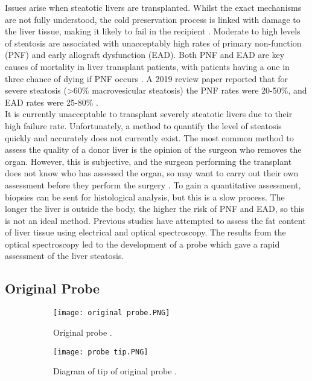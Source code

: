 Issues arise when steatotic livers are transplanted. Whilst the exact mechanisms are not fully understood, the cold preservation process is linked with damage to the liver tissue, making it likely to fail in the recipient \cite{Imber2002}. Moderate to high levels of steatosis are associated with unacceptably high rates of primary non-function (PNF) and early allograft dysfunction (EAD). Both PNF and EAD are key causes of mortality in liver transplant patients, with patients having a one in three chance of dying if PNF occurs \cite{Robertson}. A 2019 review paper reported that for severe steatosis (\textgreater60\% macrovesicular steatosis) the PNF rates were 20-50\%, and EAD rates were 25-80\% \cite{Linares2019}.\\

It is currently unacceptable to transplant severely steatotic livers due to their high failure rate. Unfortunately, a method to quantify the level of steatosis quickly and accurately does not currently exist. The most common method to assess the quality of a donor liver is the opinion of the surgeon who removes the organ. However, this is subjective, and the surgeon performing the transplant does not know who has assessed the organ, so may want to carry out their own assessment before they perform the surgery \cite{Robertson}. To gain a quantitative assessment, biopsies can be sent for histological analysis, but this is a slow process. The longer the liver is outside the body, the higher the risk of PNF and EAD, so this is not an ideal method. Previous studies \cite{McLaughlin2010} have attempted to assess the fat content of liver tissue using electrical and optical spectroscopy. The results from the optical spectroscopy led to the development of a probe \cite{Robertson} which gave a rapid assessment of the liver steatosis. \\


\subsection{Original Probe}

\begin{figure}[htbp]
	\centering
	\begin{subfigure}[b]{0.4\linewidth}
		\texttt{[image: original probe.PNG]}
		\caption{Original probe \cite{Robertson}.}
		\label{fig: original probe}
	\end{subfigure}
	\begin{subfigure}[b]{0.4\linewidth}
		\texttt{[image: probe tip.PNG]}
		\caption{Diagram of tip of original probe \cite{Robertson}.}
		\label{fig: probe tip}
	\end{subfigure}
	\caption{}
\end{figure}

